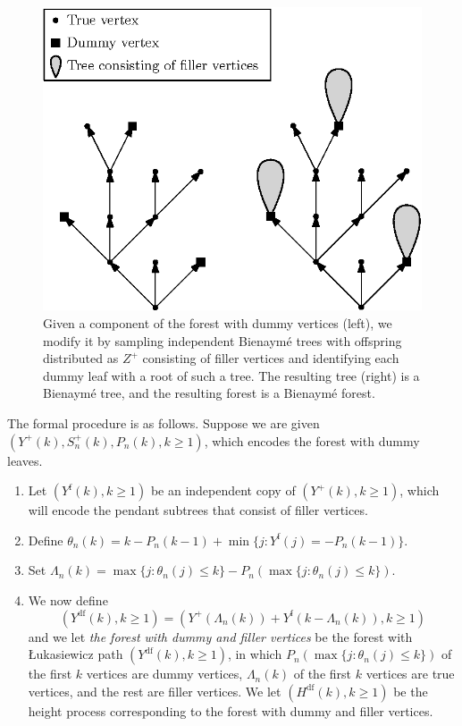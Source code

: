 \begin{figure}
    \centering
    \includegraphics[scale=1]{Content/Pictures/dummy_filler.eps}
    \caption{Given a component of the forest with dummy vertices (left), we modify it by sampling independent Bienaymé trees with offspring distributed as $Z^+$ consisting of filler vertices and identifying each dummy leaf with a root of such a tree. The resulting tree (right) is a Bienaymé tree, and the resulting forest is a Bienaymé forest.}
    \label{fig.blackpurpleredforest}
\end{figure}
The formal procedure is as follows. Suppose we are given $(Y^+(k),S^{+}_n(k),P_n(k),k\geq 1)$, which encodes the forest with dummy leaves.
\begin{enumerate}
    \item Let $(Y^{\mathrm{f}}(k),k\geq 1)$ be an independent copy of $(Y^+(k),k\geq 1)$, which will encode the pendant subtrees that consist of filler vertices.
    \item Define $\theta_n(k)=k-P_n(k-1)+\min\{j: Y^{\mathrm{f}}(j)=-P_n(k-1)\}$. 
    \item Set $\Lambda_n(k)=\max\{j:\theta_n(j)\leq k\}-P_n(\max\{j:\theta_n(j)\leq k\})$. 
    \item We now define \begin{equation}\label{eq.definitionYdf}(Y^{\mathrm{df}}(k),k\geq 1)=(Y^+(\Lambda_n(k))+Y^{\mathrm{f}}(k-\Lambda_n(k)),k\geq 1)\end{equation}
    and we let \emph{the forest with dummy and filler vertices} be the forest with \L ukasiewicz path $(Y^{\mathrm{df}}(k),k\geq 1)$, in which $P_n(\max\{j:\theta_n(j)\leq k\})$ of the first $k$ vertices are dummy vertices, $\Lambda_n(k)$ of the first $k$ vertices are true vertices, and the rest are filler vertices. We let $(H^{\mathrm{df}}(k),k\geq 1)$ be the height process corresponding to the forest with dummy and filler vertices.
\end{enumerate}
